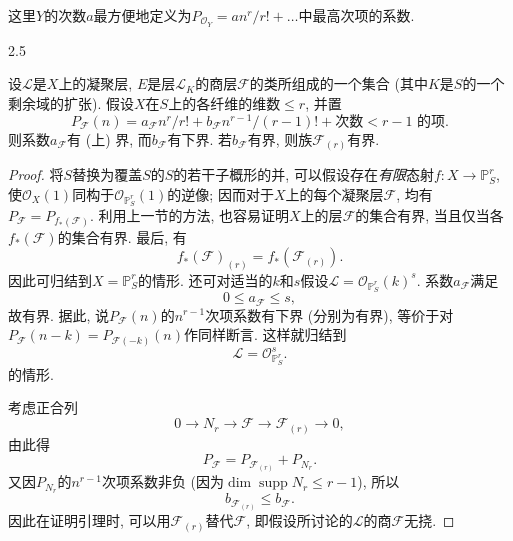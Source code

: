 \par{}这里\(Y\)的次数\(a\)最方便地定义为\(P_{\mathcal {O}_Y}=an^r/r!+\ldots \)中最高次项的系数.
\begin{lemma}{2.5}\label{fga3.iv-2-lemma-2.5}\skipsinglepar
\par{}设\(\mathscr {L}\)是\(X\)上的凝聚层, \(E\)是层\(\mathscr {L}_K\)的商层\(\mathscr {F}\)的类所组成的一个集合 (其中\(K\)是\(S\)的一个剩余域的扩张). 假设\(X\)在\(S\)上的各纤维的维数\(\leqslant  r\), 并置\[       P_\mathscr {F}(n)       = a_\mathscr {F}n^r/r! + b_\mathscr {F}n^{r-1}/(r-1)! + \text {次数}<r-1\text { 的项}.\] 则系数\(a_\mathscr {F}\)有 (上) 界, 而\(b_\mathscr {F}\)有下界. 若\(b_\mathscr {F}\)有界, 则族\(\mathscr {F}_{(r)}\)有界.
\begin{proof}
\par{}将\(S\)替换为覆盖\(S\)的\(S\)的若干子概形的并, 可以假设存在\emph{有限}态射\(f\colon  X\to \mathbb {P}_S^r\), 使\(\mathcal {O}_X(1)\)同构于\(\mathcal {O}_{\mathbb {P}_S^r}(1)\)的逆像; 因而对于\(X\)上的每个凝聚层\(\mathscr {F}\), 均有\(P_\mathscr {F}=P_{f_*(\mathscr {F})}\). 利用上一节的方法, 也容易证明\(X\)上的层\(\mathscr {F}\)的集合有界, 当且仅当各\(f_*(\mathscr {F})\)的集合有界. 最后, 有\[         f_*(\mathscr {F})_{(r)}         = f_*(\mathscr {F}_{(r)}).\] 因此可归结到\(X=\mathbb {P}_S^r\)的情形. 还可对适当的\(k\)和\(s\)假设\(\mathscr {L}=\mathcal {O}_{\mathbb {P}_S^r}(k)^s\). 系数\(a_\mathscr {F}\)满足\[         0\leqslant  a_\mathscr {F} \leqslant  s,\] 故有界. 据此, 说\(P_\mathscr {F}(n)\)的\(n^{r-1}\)次项系数有下界 (分别为有界), 等价于对\(P_\mathscr {F}(n-k)=P_{\mathscr {F}(-k)}(n)\)作同样断言. 这样就归结到\[         \mathscr {L}         = \mathcal {O}_{\mathbb {P}_S^r}^s.       \]的情形.
\par{}考虑正合列\[         0 \to  N_r \to  \mathscr {F} \to  \mathscr {F}_{(r)} \to  0,\] 由此得\[         P_\mathscr {F}         = P_{\mathscr {F}_{(r)}} + P_{N_r}.\] 又因\(P_{N_r}\)的\(n^{r-1}\)次项系数非负 (因为\(\dim \operatorname {supp} N_r\leqslant  r-1\)), 所以\[         b_{\mathscr {F}_{(r)}} \leqslant  b_\mathscr {F}.\] 因此在证明引理时, 可以用\(\mathscr {F}_{(r)}\)替代\(\mathscr {F}\), 即假设所讨论的\(\mathscr {L}\)的商\(\mathscr {F}\)无挠.

\end{proof}
\end{lemma}
